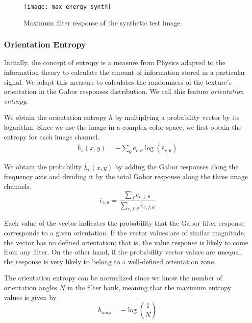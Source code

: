 \begin{figure}[!ht]
	\texttt{[image: max\_energy\_synth]}
    \caption{Maximum filter response of the synthetic test image.}
    \label{fig:max_energy_synth}
\end{figure}

\subsubsection{Orientation Entropy}
Initially, the concept of entropy is a measure from Physics adapted to the information theory to calculate the amount of information stored in a particular signal. We adapt this measure to calculates the randomness of the texture's orientation in the Gabor responses distribution.  We call this feature \textit{orientation entropy}.

We obtain the orientation entropy $h$ by multiplying a probability vector by its logarithm. Since we use the image in a complex color space, we first obtain the entropy for each image channel.
\begin{gather}
    \widetilde{h_c}(x,y) = -\sum_{\theta} \overline{e}_{c, \theta} \log (\overline{e}_{c, \theta}) \label{eq:entropy_orient_ch}
\end{gather}

We obtain the probability $\widetilde{h_c}(x,y)$ by adding the Gabor responses along the frequency axis and dividing it by the total Gabor response along the three image channels.
\begin{equation}
	\overline{e}_{c, \theta} =  \frac{\sum_f \widetilde{e}_{c, f, \theta}}{\sum_{c, f, \theta}\widetilde{e}_{c, f, \theta} }  \label{eq:gabor_energy_ch_orient_prob}
\end{equation}

Each value of the vector indicates the probability that the Gabor filter response corresponds to a given orientation. If the vector values are of similar magnitude, the vector has no defined orientation; that is, the value response is likely to come from any filter. On the other hand, if the probability vector values are unequal, the response is very likely to belong to a well-defined orientation zone.

The orientation entropy can be normalized since we know the number of orientation angles $N$ in the filter bank, meaning that the maximum entropy values is given by 
\begin{equation}
    h_{max} = -\log\left(\frac{1}{N}\right) \label{eq:max_entropy_orient} 
\end{equation}

